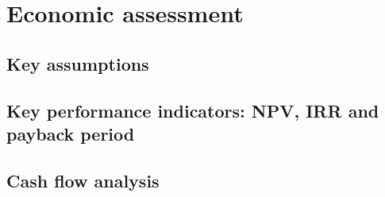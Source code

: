 \section{Economic assessment}
\subsection{Key assumptions}
\subsection{Key performance indicators: NPV, IRR and payback period}
\subsection{Cash flow analysis}
